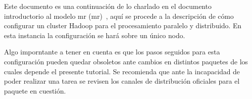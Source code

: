 Este documento es una continuación de lo charlado en el documento introductorio
al modelo \acrlong{mr} (\acrshort{mr})~\cite{ramirez2021}, aquí se procede a la
descripción de cómo configurar un cluster Hadoop para el procesamiento paralelo
y distribuido. En esta instancia la configuración se hará sobre un único nodo.

Algo imporntante a tener en cuenta es que los pasos seguidos para esta configuración
pueden quedar obsoletos ante cambios en distintos paquetes de los cuales
depende el presente tutorial. Se recomienda que ante la incapacidad de poder
realizar una tarea se revisen los canales de distribución oficiales para el
paquete en cuestión.


